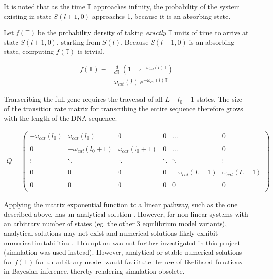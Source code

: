\documentclass[10pt,letterpaper]{article}
\begin{document}
It is noted that as the time $\mathbb{T}$ approaches infinity, the probability of the system existing in state $S(l+1,0)$ approaches 1, because it is an absorbing state.

Let $f(\mathbb{T})$ be the probability density of taking \textit{exactly} $\mathbb{T}$ units of time to arrive at state $S(l+1,0)$, starting from $S(l)$. Because $S(l+1,0)$ is an absorbing state, computing $f(\mathbb{T})$ is trivial.


\begin{align}
    f(\mathbb{T}) =& \frac{d}{d\mathbb{T}} \; (1 - e^{-\omega_{cat}(l) \mathbb{T}}) \\
     =& \omega_{cat}(l) \; e^{- \omega_{cat}(l) \mathbb{T}}
\end{align}





Transcribing the full gene requires the traversal of all $L - l_0 + 1$ states. The size of the transition rate matrix for transcribing the entire sequence therefore grows with the length of the DNA sequence.


\begin{align}
    Q = \begin{pmatrix}
        -\omega_{cat}(l_0) & \omega_{cat}(l_0) & 0 & 0 & \dotso & 0 \\ \\
        0 & -\omega_{cat}(l_0 + 1) & \omega_{cat}(l_0 + 1) & 0 & \dotso & 0 \\ \\
        \vdots & \ddots & \ddots &  \ddots & \ddots & \vdots\\ \\
        0 & 0 & 0 & 0 & -\omega_{cat}(L - 1) & \omega_{cat}(L - 1) \\ \\
        0 & 0 & 0 & 0 & 0  & 0\\
    \end{pmatrix}
\end{align}


Applying the matrix exponential function to a linear pathway, such as the one described above, has an analytical solution \cite{jahnke2007solving}. However, for non-linear systems with an arbitrary number of states (eg. the other 3 equilibrium model variants), analytical solutions may not exist and numerical solutions likely exhibit numerical instabilities \cite{moler2003nineteen}. This option was not further investigated in this project (simulation was used instead). However, analytical or stable numerical solutions for $f(\mathbb{T})$ for an arbitrary model would facilitate the use of likelihood functions in Bayesian inference, thereby rendering simulation obsolete.
\end{document}
